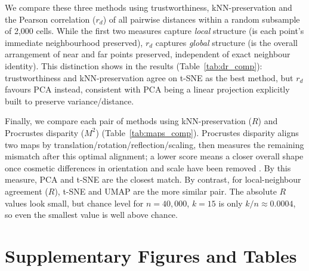 \documentclass[11pt,a4paper]{article}
\newcommand{\tsne}{t-SNE}
\newcommand{\trust}{trustworthiness}
\newcommand{\knnp}{kNN-preservation}
\begin{document}
We compare these three methods using \trust{}, \knnp{} and the Pearson correlation ($r_d$) of all
pairwise distances within a random subsample of 2{,}000 cells. While the first two measures capture \emph{local} structure (is each point's immediate neighbourhood
preserved), $r_d$ captures \emph{global} structure (is the overall arrangement of near and far
points preserved, independent of exact neighbour identity). This distinction shows in the results (Table~\ref{tab:dr_comp}): \trust{} and \knnp{} agree on \tsne{} as the best method, but $r_d$ favours
PCA instead, consistent with PCA being a linear projection explicitly built to preserve variance/distance.

\begin{table}[h]
  \centering
  \begin{minipage}{0.62\linewidth}
    \centering
    {\footnotesize}
    \caption{PCA, \tsne{} and UMAP: local structure via \trust{} ($T$) and \knnp{} ($R$), global
    structure via Pearson correlation ($r_d$) of pairwise distances. $T,R$ use $k=15$. Green: best per
    column; red: worst.}
    \label{tab:dr_comp}
  \end{minipage}
  \hfill
  \begin{minipage}{0.34\linewidth}
    \centering
    {\footnotesize}
    \caption{Pairwise \knnp{} ($R$, local) and Procrustes disparity ($M^2$, aligned global shape).}
    \label{tab:maps_comp}
  \end{minipage}
\end{table}

Finally, we compare each pair of methods using \knnp{} ($R$) and Procrustes disparity ($M^2$)
(Table~\ref{tab:maps_comp}). Procrustes disparity aligns two maps by translation/rotation/reflection/scaling, then measures the remaining mismatch after this optimal alignment;
a lower score means a closer overall shape once cosmetic differences in orientation and scale have been
removed \citep{scipy2020}.
By this measure, PCA and \tsne{} are the closest match. By contrast, for local-neighbour
agreement ($R$), \tsne{} and UMAP are the more similar pair. The absolute $R$ values look small, but
chance level for $n=40{,}000$, $k=15$ is only $k/n\approx0.0004$, so even the smallest value is well
above chance.






\appendix
\section*{Supplementary Figures and Tables}
\end{document}
